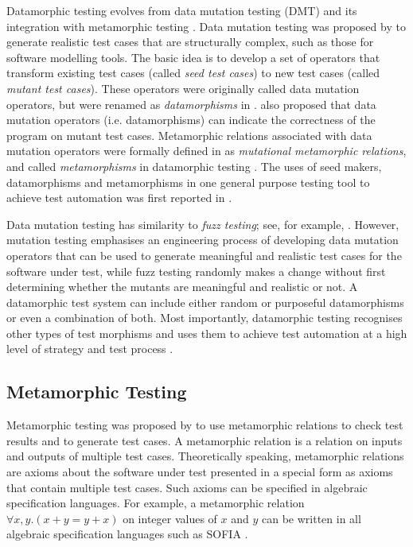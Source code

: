 \documentclass[preprint,1p,authoryear,times]{elsarticle}
\begin{document}
Datamorphic testing evolves from data mutation testing (DMT) \citep{DataMutationJournal2009} and its integration with metamorphic testing \citep{Zhu2015JFuzz}. Data mutation testing was proposed by \citet{DataMutationWorkshop2006} to generate realistic test cases that are structurally complex, such as those for software modelling tools. The basic idea is to develop a set of operators that transform existing test cases (called \emph{seed test cases}) to new test cases (called \emph{mutant test cases}). These operators were originally called data mutation operators, but were renamed as \emph{datamorphisms} in \citep{Datamorphic2019}. \citet{DataMutationJournal2009} also proposed that data mutation operators (i.e. datamorphisms) can indicate the correctness of the program on mutant test cases. Metamorphic relations associated with data mutation operators were formally defined in \citep{Zhu2015JFuzz} as \emph{mutational metamorphic relations}, and called \emph{metamorphisms} in datamorphic testing \citep{Datamorphic2019}. The uses of seed makers, datamorphisms and metamorphisms in one general purpose testing tool to achieve test automation was first reported in \citep{Zhu2015JFuzz}. 

Data mutation testing has similarity to \emph{fuzz testing}; see, for example, \citep{FuzzTestBook2007}. However, mutation testing emphasises an engineering process of developing data mutation operators that can be used to generate meaningful and realistic test cases for the software under test, while fuzz testing randomly makes a change without first determining whether the mutants are meaningful and realistic or not. A datamorphic test system can include either random or purposeful datamorphisms or even a combination of both. Most importantly, datamorphic testing recognises other types of test morphisms and uses them to achieve test automation at a high level of strategy and test process \citep{Datamorphic2019, AITest2020}. 

\subsection{Metamorphic Testing}

Metamorphic testing was proposed by \citet{MetamorphicTest1998} to use metamorphic relations to check test results and to generate test cases. A metamorphic relation is a relation on inputs and outputs of multiple test cases. Theoretically speaking, metamorphic relations are axioms about the software under test presented in a special form as axioms that contain multiple test cases. Such axioms can be specified in algebraic specification languages. For example, a metamorphic relation $\forall x, y.(x + y = y + x)$ on integer values of $x$ and $y$ can be written in all algebraic specification languages such as SOFIA \citep{SOFIA2014}. 
\end{document}
